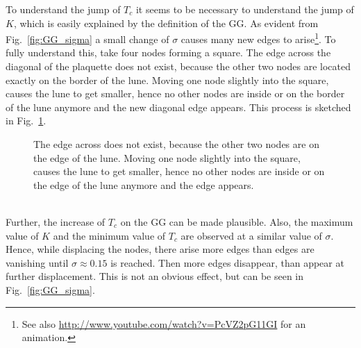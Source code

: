         To understand the jump of \(T_c\) it seems to be necessary to
        understand the jump of \(K\), which is easily explained
        by the definition of the GG. As evident from Fig.\ \ref{fig:GG_sigma}
        a small change of \(\sigma\) causes many new edges to arise\footnote{See also \url{http://www.youtube.com/watch?v=PcVZ2pG11GI} for an animation.}.
        To fully understand this, take four nodes forming a square. The edge
        across the diagonal of the plaquette does not exist, because the
        other two nodes are located exactly on the border
        of the lune. Moving one node slightly into the square, causes the lune
        to get smaller, hence no other nodes are inside or on the border of
        the lune anymore and the new diagonal edge appears. This process is sketched in
        Fig.\ \ref{fig:GGEdge}.
        \begin{figure}[htbp]
            \centering
            \subfigure[][]{
                \label{sfig:GGEdge:before}
                
            }
            \subfigure[][]{
                \label{sfig:GGEdge:after}
                
            }
            \caption[Sketch why Many New Edges Arise at the Transition from $\sigma = 0$ to $\sigma > 0$]
            {
                 The edge across does not exist,
                because the other two nodes are on the edge of the lune.
                 Moving one node slightly into the
                square, causes the lune to get smaller, hence no other nodes
                are inside or on the edge of the lune anymore and the edge
                appears.
            }
            \label{fig:GGEdge}
        \end{figure}\\
        Further, the increase of \(T_c\) on the GG can be made plausible.
        Also, the maximum value of \(K\) and the minimum value of \(T_c\)
        are observed at a similar value of \(\sigma\). Hence, while displacing the nodes, there arise more edges
        than edges are vanishing until \(\sigma \approx 0.15\) is reached.
        Then more edges disappear, than appear at further displacement. This
        is not an obvious effect, but can be seen in Fig.\ \ref{fig:GG_sigma}.
